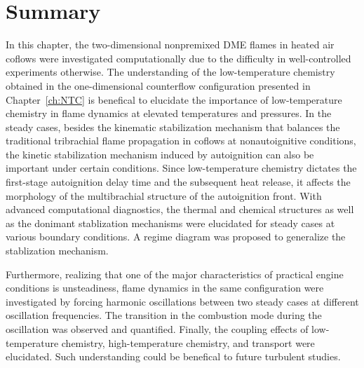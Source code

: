 \section{Summary}

In this chapter, the two-dimensional nonpremixed DME flames in heated air coflows were investigated computationally due to the difficulty in well-controlled experiments otherwise.  The understanding of the low-temperature chemistry obtained in the one-dimensional counterflow configuration presented in Chapter~\ref{ch:NTC} is benefical to elucidate the importance of low-temperature chemistry in flame dynamics at elevated temperatures and pressures.  In the steady cases, besides the kinematic stabilization mechanism that balances the traditional tribrachial flame propagation in coflows at nonautoignitive conditions, the kinetic stabilization mechanism induced by autoignition can also be important under certain conditions.  Since low-temperature chemistry dictates the first-stage autoignition delay time and the subsequent heat release, it affects the morphology of the multibrachial structure of the autoignition front.  With advanced computational diagnostics, the thermal and chemical structures as well as the donimant stablization mechanisms were elucidated for steady cases at various boundary conditions.  A regime diagram was proposed to generalize the stablization mechanism.  

Furthermore, realizing that one of the major characteristics of practical engine conditions is unsteadiness, flame dynamics in the same configuration were investigated by forcing harmonic oscillations between two steady cases at different oscillation frequencies.  The transition in the combustion mode during the oscillation was observed and quantified.  Finally, the coupling effects of low-temperature chemistry, high-temperature chemistry, and transport were elucidated.  Such understanding could be benefical to future turbulent studies.
